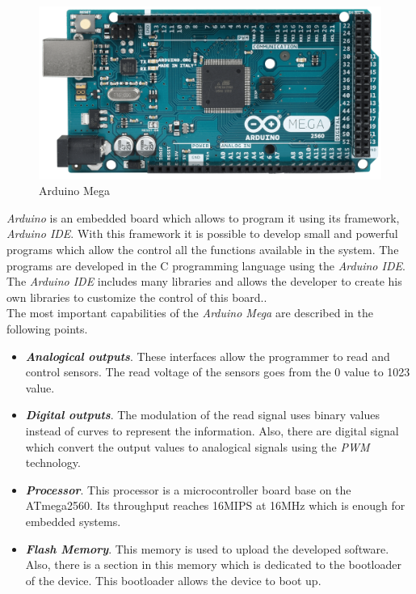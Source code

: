 \begin{figure}[H]
\begin{centering}
\includegraphics[scale=0.08]{IMGS/ARDUINO_MEGA.png}
\caption{Arduino Mega \label{Arduino_Mega}}
\end{centering}
\end{figure}

\textit{Arduino} is an embedded board which allows to program it using its framework, \textit{Arduino IDE}. With this framework it is possible to develop small and powerful programs which allow the control all the functions available in the system. The programs are developed in the C programming language using the \textit{Arduino IDE}. The \textit{Arduino IDE} includes many libraries and allows the developer to create his own libraries to customize the control of this board..\\

The most important capabilities of the \textit{Arduino Mega} are described in the following points.

\begin{itemize}

\item \textbf{\textit{Analogical outputs}}. These interfaces allow the programmer to read and control sensors. The read voltage of the sensors goes from the 0 value to 1023 value.

\item \textbf{\textit{Digital outputs}}. The modulation of the read signal uses binary values instead of curves to represent the information. Also, there are digital signal which convert the output values to analogical signals using the \textit{PWM} technology.

\item \textbf{\textit{Processor}}. This processor is a microcontroller board base on the ATmega2560. Its throughput reaches 16MIPS at 16MHz which is enough for embedded systems.

\item \textbf{\textit{Flash Memory}}. This memory is used to upload the developed software. Also, there is a section in this memory which is dedicated to the bootloader of the device. This bootloader allows the device to boot up.

\end{itemize}


